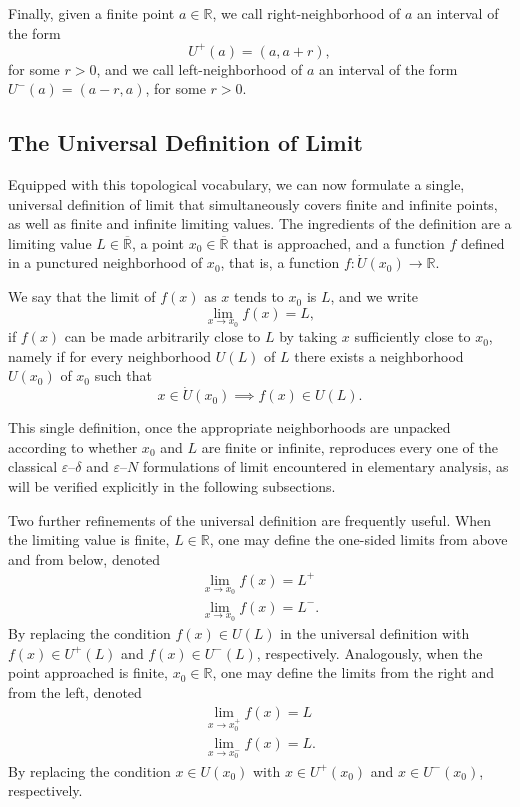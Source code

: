 Finally, given a finite point $a \in \mathbb{R}$, we call right-neighborhood of $a$ an interval of the form
\[
U^+(a) = (a, a+r),
\] for some $r > 0$, and we call left-neighborhood of $a$ an interval of the form $U^-(a) = (a-r, a)$, for some $r > 0$.

\subsection{The Universal Definition of Limit}

Equipped with this topological vocabulary, we can now formulate a single, universal definition of limit that simultaneously covers finite and infinite points, as well as finite and infinite limiting values. The ingredients of the definition are a limiting value $L \in \overline{\mathbb{R}}$, a point $x_0 \in \overline{\mathbb{R}}$ that is approached, and a function $f$ defined in a punctured neighborhood of $x_0$, that is, a function $f : \dot{U}(x_0) \to \mathbb{R}$.

\begin{definition}
We say that the limit of $f(x)$ as $x$ tends to $x_0$ is $L$, and we write \[
\lim_{x \to x_0} f(x) = L,
\] if $f(x)$ can be made arbitrarily close to $L$ by taking $x$ sufficiently close to $x_0$, namely if for every neighborhood $U(L)$ of $L$ there exists a neighborhood $U(x_0)$ of $x_0$ such that
\[
x \in \dot{U}(x_0) \implies f(x) \in U(L).
\]

\end{definition}

This single definition, once the appropriate neighborhoods are unpacked according to whether $x_0$ and $L$ are finite or infinite, reproduces every one of the classical $\varepsilon$--$\delta$ and $\varepsilon$--$N$ formulations of limit encountered in elementary analysis, as will be verified explicitly in the following subsections.

Two further refinements of the universal definition are frequently useful. When the limiting value is finite, $L \in \mathbb{R}$, one may define the one-sided limits from above and from below, denoted
\[
\begin{gathered}
\lim_{x \to x_0} f(x) = L^+ \\
\lim_{x \to x_0} f(x) = L^-.
\end{gathered}
\]
By replacing the condition $f(x) \in U(L)$ in the universal definition with $f(x) \in U^+(L)$ and $f(x) \in U^-(L)$, respectively. Analogously, when the point approached is finite, $x_0 \in \mathbb{R}$, one may define the limits from the right and from the left, denoted
\[
\begin{gathered}
\lim_{x \to x_0^+} f(x) = L \\
\lim_{x \to x_0^-} f(x) = L.
\end{gathered}
\]
By replacing the condition $x \in U(x_0)$ with $x \in U^+(x_0)$ and $x \in U^-(x_0)$, respectively.

